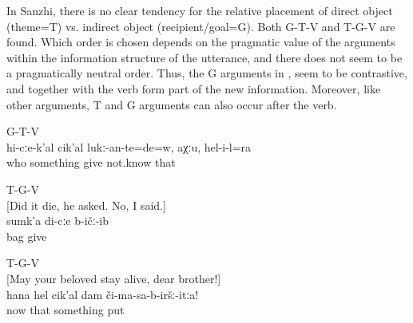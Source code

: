 In Sanzhi, there is no clear tendency for the relative placement of direct object (theme=T) vs. indirect object (recipient\slash goal=G). Both G-T-V and T-G-V are found. Which order is chosen depends on the pragmatic value of the arguments within the information structure of the utterance, and there does not seem to be a pragmatically neutral order. Thus, the G arguments in ,  seem to be contrastive, and together with the verb form part of the new information.  Moreover, like other arguments, T and G arguments can also occur after the verb.
%
\begin{exe}
	\ex	G-T-V\\\label{ex:‎‎He had also to give something to somebody, I don't know GTV}%
	\gll	hi-cːe-k'al	cik'al	lukː-an-te=de=w,	aχːu,	hel-i-l=ra\\
		who	something	give	not.know that\\
	\glt	{}

	\ex	T-G-V\\\label{ex:‎‎From there he ran away, gave me his bag TGV}%
		[Did it die, he asked. No, I said.]\\
	\gll	sumk'a	di-cːe	b-ičː-ib\\
		bag		give\\
	\glt	{}

	\ex	T-G-V\\\label{ex:Do not put that thing on me!}%
		‎[May your beloved stay alive, dear brother!]\\
	\gll	hana	hel	cik'al	dam	či-ma-sa-b-iršː-itːa!\\
		now	that	something		put\\
	\glt	{}
\end{exe}

